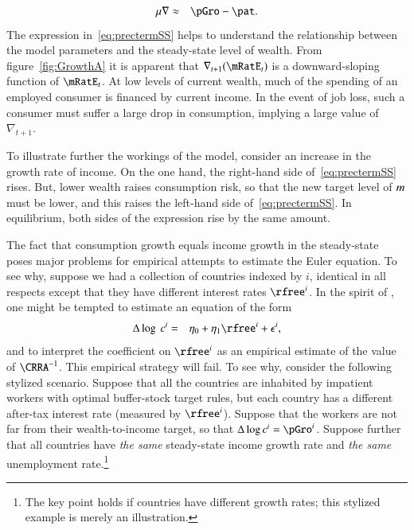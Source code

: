 \documentclass[titlepage,abstract]{\econtex}\newcommand{\texname}{ctDiscrete}
\begin{document}
\begin{eqnarray}
        \urate \nablaTarg & \approx & \pGro - \pat. \label{eq:prectermSS}
\end{eqnarray}
The expression in~\eqref{eq:prectermSS} helps to understand the relationship between
the model parameters and the steady-state level of wealth. From figure~\ref{fig:GrowthA} it is apparent that $\nabla_{t+1}(\mRatE_{t})$ is a downward-sloping function of $\mRatE_{t}$. At low levels of current wealth, much of the spending of an employed consumer is financed by current income.  In the event of job loss, such a consumer must suffer a large drop in consumption, implying a large value of $\nabla_{t+1}$.

To illustrate further the workings of the model, consider an increase in the growth rate of income. On the one hand, the right-hand side of~\eqref{eq:prectermSS} rises. But, lower wealth raises consumption risk, so that the new target level of $\mTarg^{\null}$ must be lower, and this raises the left-hand side of~\eqref{eq:prectermSS}. In equilibrium, both sides of the expression rise by the same amount. 

The fact that consumption growth equals income growth in the steady-state poses major problems for empirical attempts to estimate the Euler equation.  To see why, suppose we had a collection of countries indexed by $i$, identical in all respects except that they have different interest rates $\rfree^{i}$. In the spirit of \cite{hallSubstitution}, one might be tempted to estimate an equation of the form
\begin{eqnarray}
        \Delta \log ~ \cLev^{i} & = & \eta_{0} + \eta_{1} \rfree^{i}+\epsilon^{i}, \label{eq:regression}
\end{eqnarray}
and to interpret the coefficient on $\rfree^{i}$ as an empirical
estimate of the value of $\CRRA^{-1}$. This empirical strategy will
fail. To see why, consider the following stylized scenario. Suppose
that all the countries are inhabited by impatient workers with optimal
buffer-stock target rules, but each country has a different after-tax
interest rate (measured by $\rfree^{i}$). Suppose that the workers are
not far from their wealth-to-income target, so that $\Delta \log
\cLev^{i} = \pGro^{i}$. Suppose further that all countries have \textit{the same} steady-state income growth rate and \textit{the same}
unemployment rate.\footnote{The key point holds if countries have different growth
  rates; this stylized example is merely an illustration. }
\end{document}
